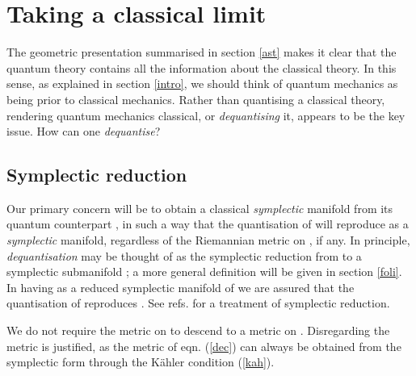 \documentclass[a4paper,a4paper]{article}
\begin{document}
\section{Taking a classical limit}\label{claslim}

The geometric presentation summarised in section \ref{ast} makes it clear 
that the quantum theory contains all the information about the classical theory. 
In this sense, as explained in section \ref{intro}, we should think of 
quantum mechanics as being prior to classical mechanics. Rather than 
quantising a classical theory, rendering quantum mechanics classical, 
or {\it dequantising}\/ it, appears to be the key issue. How can one 
{\it dequantise}\/? 

\subsection{Symplectic reduction}\label{rol}

Our primary concern will be to obtain a classical {\it symplectic} manifold 
\coordHE{} from its quantum counterpart \coordHE{}, 
in such a way that the quantisation of \coordHE{} will reproduce \coordHE{} as a {\it symplectic} manifold,  regardless of the Riemannian metric 
\coordHE{} on \coordHE{}, if any. In principle, {\it dequantisation} may be thought of 
as the symplectic reduction from \coordHE{} to a symplectic submanifold 
\coordHE{}; a more general definition will be given in 
section \ref{foli}. In having \coordHE{} as a reduced symplectic 
manifold of \coordHE{} we are assured that the quantisation of \coordHE{} 
reproduces \coordHE{}. See refs. \cite{RATIU, WEINSTEIN} 
for a treatment of symplectic reduction.

We do not require the metric \coordHE{} on \coordHE{} to descend to a metric \coordHE{} 
on \coordHE{}. Disregarding the metric \coordHE{} is justified, as the metric \coordHE{} 
of eqn. (\ref{dec}) can always be obtained from the symplectic form \coordHE{} 
through the K\"ahler condition (\ref{kah}).
 
\end{document}
